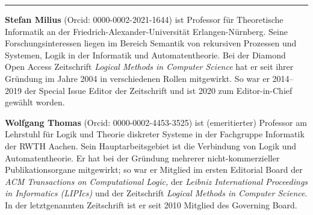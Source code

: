 \begin{center}\rule{0.5\linewidth}{0.5pt}\end{center}

\textbf{Stefan Milius} (Orcid: 0000-0002-2021-1644) ist Professor für
Theoretische Informatik an der Friedrich-Alexander-Universität
Erlangen-Nürnberg. Seine Forschungsinteressen liegen im Bereich Semantik
von rekursiven Prozessen und Systemen, Logik in der Informatik und
Automatentheorie. Bei der Diamond Open Access Zeitschrift \emph{Logical
Methods in Computer Science} hat er seit ihrer Gründung im Jahre 2004 in
verschiedenen Rollen mitgewirkt. So war er 2014--2019 der Special Issue
Editor der Zeitschrift und ist 2020 zum Editor-in-Chief gewählt worden.

\textbf{Wolfgang Thomas} (Orcid: 0000-0002-4453-3525) ist (emeritierter)
Professor am Lehrstuhl für Logik und Theorie diskreter Systeme in der
Fachgruppe Informatik der RWTH Aachen. Sein Hauptarbeitsgebiet ist die
Verbindung von Logik und Automatentheorie. Er hat bei der Gründung
mehrerer nicht-kommerzieller Publikationsorgane mitgewirkt; so war er
Mitglied im ersten Editorial Board der \emph{ACM Transactions on
Computational Logic,} der \emph{Leibniz International Proceedings in
Informatics (LIPIcs)} und der Zeitschrift \emph{Logical Methods in
Computer Science}. In der letztgenannten Zeitschrift ist er seit 2010
Mitglied des Governing Board.
